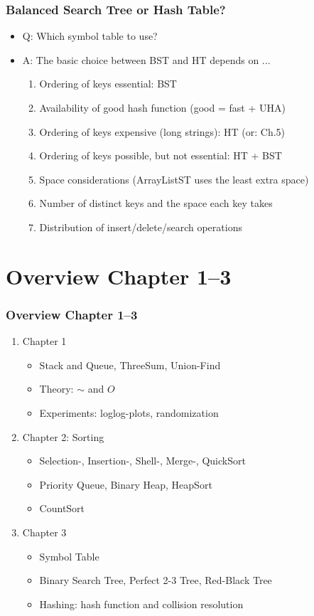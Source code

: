 \documentclass[handout]{beamer}
\begin{document}
\begin{frame}[fragile]
    \frametitle{Balanced Search Tree or Hash Table?}

\begin{itemize}[<+->]
\item Q: Which symbol table to use?
\item A: The basic choice between BST and HT depends on ...
  \begin{enumerate}[<+->]
  \item Ordering of keys essential: BST
  \item Availability of good hash function (good = fast + UHA)
  \item Ordering of keys expensive (long strings): HT (or: Ch.5)
  \item Ordering of keys possible, but not essential: HT + BST
  \item Space considerations (ArrayListST uses the least extra space)
  \item Number of distinct keys and the space each key takes
  \item Distribution of insert/delete/search operations
  \end{enumerate}
\end{itemize}
\end{frame}

\section{Overview Chapter 1--3}

\begin{frame}[fragile]
    \frametitle{Overview Chapter 1--3}

\begin{enumerate}[<+->]
\item[] Chapter 1
 \begin{itemize}[<+->]
 \item Stack and Queue, ThreeSum, Union-Find
 \item Theory: $\sim$ and $O$
 \item Experiments: loglog-plots, randomization 
 \end{itemize}
\item[] Chapter 2: Sorting
 \begin{itemize}[<+->]
 \item Selection-, Insertion-, Shell-, Merge-, QuickSort
 \item Priority Queue, Binary Heap, HeapSort
 \item CountSort
 \end{itemize}
 \item[] Chapter 3
 \begin{itemize}[<+->]
 \item Symbol Table
 \item Binary Search Tree, Perfect 2-3 Tree, Red-Black Tree
 \item Hashing: hash function and collision resolution
 \end{itemize}
\end{enumerate}
\end{frame}
\end{document}
